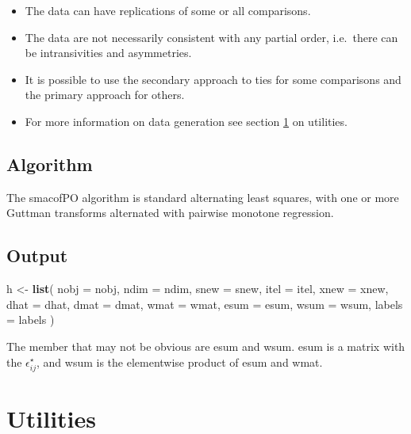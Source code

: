 \documentclass[
  12pt,
]{article}
\newenvironment{Shaded}{\begin{snugshade}}{\end{snugshade}}
\newcommand{\AttributeTok}[1]{\textcolor[rgb]{0.13,0.29,0.53}{#1}}
\newcommand{\FunctionTok}[1]{\textcolor[rgb]{0.13,0.29,0.53}{\textbf{#1}}}
\newcommand{\NormalTok}[1]{#1}
\newcommand{\OtherTok}[1]{\textcolor[rgb]{0.56,0.35,0.01}{#1}}
\providecommand{\tightlist}{%
  \setlength{\itemsep}{0pt}\setlength{\parskip}{0pt}}
\begin{document}
\begin{itemize}
\tightlist
\item
  The data can have replications of some or all comparisons.
\item
  The data are not necessarily consistent with any partial order, i.e.~there can be intransivities and asymmetries.
\item
  It is possible to use the secondary approach to ties for some comparisons
  and the primary approach for others.
\item
  For more information on data generation see section \ref{utilities} on utilities.
\end{itemize}

\subsection{Algorithm}\label{algorithm}

The smacofPO algorithm is standard alternating least squares, with one or
more Guttman transforms alternated with pairwise monotone regression.

\subsection{Output}\label{output}

\begin{Shaded}
\begin{Highlighting}[]
\NormalTok{  h }\OtherTok{\textless{}{-}} \FunctionTok{list}\NormalTok{(}
    \AttributeTok{nobj =}\NormalTok{ nobj,}
    \AttributeTok{ndim =}\NormalTok{ ndim,}
    \AttributeTok{snew =}\NormalTok{ snew,}
    \AttributeTok{itel =}\NormalTok{ itel,}
    \AttributeTok{xnew =}\NormalTok{ xnew,}
    \AttributeTok{dhat =}\NormalTok{ dhat,}
    \AttributeTok{dmat =}\NormalTok{ dmat,}
    \AttributeTok{wmat =}\NormalTok{ wmat,}
    \AttributeTok{esum =}\NormalTok{ esum,}
    \AttributeTok{wsum =}\NormalTok{ wsum,}
    \AttributeTok{labels =}\NormalTok{ labels}
\NormalTok{  )}
\end{Highlighting}
\end{Shaded}

The member that may not be obvious are esum and wsum. esum is a matrix with the
\(\epsilon_{ij}^\star\), and wsum is the elementwise product of esum and wmat.

\section{Utilities}\label{utilities}
\end{document}
